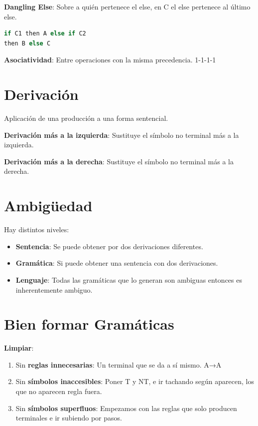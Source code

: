 \documentclass[12pt, twoside, openright]{report} %
\begin{document}
\textbf{Dangling Else}: Sobre a quién pertenece el else, en C el else
pertenece al último else.

\begin{lstlisting}[language=C]
if C1 then A else if C2
then B else C
\end{lstlisting}

\textbf{Asociatividad}: Entre operaciones con la misma precedencia.
1-1-1-1


\section{Derivación}

Aplicación de una producción a una forma sentencial.

\textbf{Derivación más a la izquierda}: Sustituye el símbolo no terminal
más a la izquierda.

\textbf{Derivación más a la derecha}: Sustituye el símbolo no terminal
más a la derecha.


\section{Ambigüedad}

Hay distintos niveles:

\begin{itemize}
	\item \textbf{Sentencia}: Se puede obtener por dos derivaciones diferentes.
	\item \textbf{Gramática}: Si puede obtener una sentencia con dos
	      derivaciones.
	\item \textbf{Lenguaje}: Todas las gramáticas que lo generan son ambiguas
	      entonces es inherentemente ambiguo.
\end{itemize}


\section{Bien formar Gramáticas}

\textbf{Limpiar}:

\begin{enumerate}
	\def\labelenumi{\arabic{enumi}.}
	\item Sin \textbf{reglas innecesarias}: Un terminal que se da a sí mismo.
	      A→A
	\item Sin \textbf{símbolos inaccesibles}: Poner T y NT, e ir tachando según
	      aparecen, los que no aparecen regla fuera.
	\item Sin \textbf{símbolos superfluos}: Empezamos con las reglas que solo
	      producen terminales e ir subiendo por pasos.
\end{enumerate}
\end{document}
